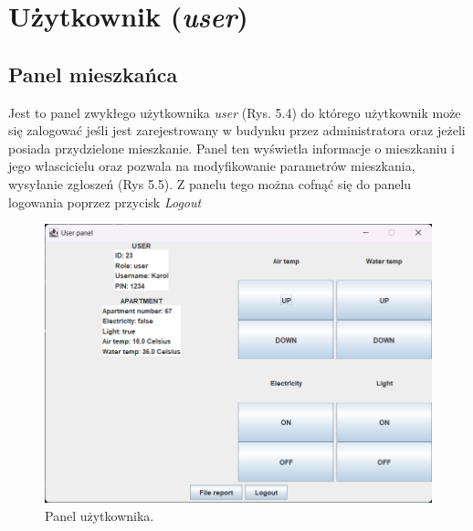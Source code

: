 \newpage
\section{Użytkownik (\textit{user})}
\subsection{Panel mieszkańca}
Jest to panel zwykłego użytkownika \textit{user} (Rys. 5.4) do którego użytkownik może się zalogować jeśli jest zarejestrowany w budynku przez 
administratora oraz jeżeli posiada przydzielone mieszkanie. Panel ten wyświetla informacje o mieszkaniu i jego włascicielu oraz pozwala na modyfikowanie parametrów mieszkania, wysyłanie zgłoszeń (Rys 5.5).
Z panelu tego można cofnąć się do panelu logowania poprzez przycisk \textit{Logout}
\begin{figure}[H]
    \centering
    \includegraphics[width=\textwidth,height=0.5\textheight,keepaspectratio]{figures/app-images/user-panel.png}
    \caption{Panel użytkownika.\label{fig9}}
\end{figure}

\newpage
